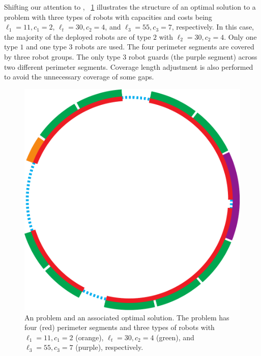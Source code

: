 Shifting our attention to \opgmc, ~\ref{fig:opgext-opgmc} illustrates the 
structure of an optimal solution to a problem with three types of robots 
with capacities and costs being $\ell_1=11, c_1=2$, $\ell_t=30, 
c_2=4$, and $\ell_3=55, c_3=7$, respectively. In this case, the majority 
of the deployed robots are of type $2$ with $\ell_2=30, c_2=4$. Only one 
type $1$ and one type $3$ robots are used. The four perimeter segments are 
covered by three robot groups. 
%
%
The only type $3$ robot guards (the purple segment) across two different 
perimeter segments. Coverage length adjustment is also performed to avoid 
the unnecessary coverage of some gaps. 

\begin{figure}[!ht]
    \centering
    \includegraphics[scale = 0.4]{chapters/opg-ext/figures/opgmc-new-t-eps-converted-to.pdf}
    \caption[An \opgmc problem and an associated optimal solution]
    {An \opgmc problem and an associated optimal solution. The 
		problem has four (red) perimeter segments and three types of robots
		with $\ell_1=11, c_1=2$ (orange), $\ell_t=30, c_2=4$ (green), 
		and $\ell_3=55, c_3=7$ (purple), respectively.}
		\label{fig:opgext-opgmc}
\end{figure}

